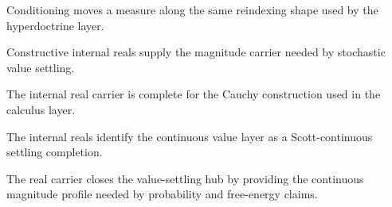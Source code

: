 \begin{theorem}\label{thm:conditioning-is-reindex}\leanok{}
Conditioning moves a measure along the same reindexing shape used by the hyperdoctrine layer.
\end{theorem}

\begin{theorem}\label{thm:internal-real-carrier}\leanok{}
Constructive internal reals supply the magnitude carrier needed by stochastic value settling.
\end{theorem}

\begin{theorem}\label{thm:internal-real-completeness}\leanok{}
The internal real carrier is complete for the Cauchy construction used in the calculus layer.
\end{theorem}

\begin{theorem}\label{thm:reals-are-scott-settling-completion}\leanok{}
The internal reals identify the continuous value layer as a Scott-continuous settling completion.
\end{theorem}

\begin{theorem}\label{thm:reals-close-value-settling-hub}\leanok{}
The real carrier closes the value-settling hub by providing the continuous magnitude profile needed
by probability and free-energy claims.
\end{theorem}
